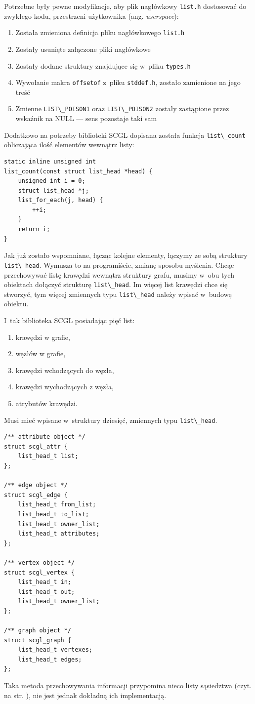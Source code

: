\documentclass[a4paper,12pt,polish,twoside,openright]{thesis}
\newcommand\code[1]{\lstinline[style=line]{#1}}
\begin{document}
Potrzebne były pewne modyfikacje, aby plik nagłówkowy \code{list.h} dostosować do zwykłego kodu, przestrzeni użytkownika (ang. \emph{userspace}):
\begin{enumerate}
	\item Została zmieniona definicja pliku nagłówkowego \code{list.h}
	\item Zostały usunięte załączone pliki nagłówkowe
	\item Zostały dodane struktury znajdujące się w~pliku \code{types.h}
	\item Wywołanie makra \code{offsetof} z~pliku \code{stddef.h}, zostało zamienione na jego treść
	\item Zmienne \code{LIST\_POISON1} oraz \code{LIST\_POISON2} zostały zastąpione przez wskaźnik na NULL --- sens pozostaje taki sam
\end{enumerate}
Dodatkowo na potrzeby biblioteki SCGL dopisana została funkcja \code{list\_count} obliczająca ilość elementów wewnątrz listy:
\begin{lstlisting}[style=code,caption=Ciało funkcji {list\_count}]
static inline unsigned int
list_count(const struct list_head *head) {
	unsigned int i = 0;
	struct list_head *j;
	list_for_each(j, head) {
		++i;
	}
	return i;
}
\end{lstlisting}

Jak już zostało wspomniane, łącząc kolejne elementy, łączymy ze sobą struktury \code{list\_head}.
Wymusza to na programiście, zmianę sposobu myślenia.
Chcąc przechowywać listę krawędzi wewnątrz struktury grafu, musimy w~obu tych obiektach dołączyć strukturę \code{list\_head}.
Im więcej list krawędzi chce się stworzyć, tym więcej zmiennych typu \code{list\_head} należy wpisać w~budowę obiektu.

I~tak biblioteka SCGL posiadając pięć list:
\begin{enumerate}
	\item krawędzi w grafie,
	\item węzłów w grafie,
	\item krawędzi wchodzących do węzła,
	\item krawędzi wychodzących z węzła,
	\item atrybutów krawędzi.
\end{enumerate}
Musi mieć wpisane w~struktury dziesięć, zmiennych typu \code{list\_head}.

\begin{lstlisting}[style=code,caption=Zastosowanie Linux Kernel List na przykładzie struktur biblioteki SCGL]
/** attribute object */
struct scgl_attr {
	list_head_t list;
};

/** edge object */
struct scgl_edge {
	list_head_t from_list;
	list_head_t to_list;
	list_head_t owner_list;
	list_head_t attributes;
};

/** vertex object */
struct scgl_vertex {
	list_head_t in;
	list_head_t out;
	list_head_t owner_list;
};

/** graph object */
struct scgl_graph {
	list_head_t vertexes;
	list_head_t edges;
};
\end{lstlisting}
Taka metoda przechowywania informacji przypomina nieco listy sąsiedztwa (czyt. na str. \pageref{neigh_list}), nie jest jednak dokładną ich implementacją.
\end{document}
